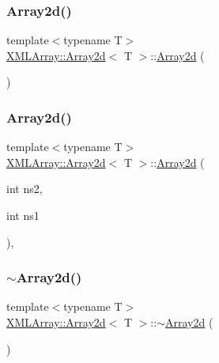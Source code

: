 \subsubsection{\texorpdfstring{Array2d()}{Array2d()}\hspace{0.1cm}{\footnotesize\ttfamily [1/9]}}
{\footnotesize\ttfamily template$<$typename T$>$ \\
\mbox{\hyperlink{classXMLArray_1_1Array2d}{X\+M\+L\+Array\+::\+Array2d}}$<$ T $>$\+::\mbox{\hyperlink{classXMLArray_1_1Array2d}{Array2d}} (\begin{DoxyParamCaption}{ }\end{DoxyParamCaption})\hspace{0.3cm}{\ttfamily [inline]}}

\mbox{\label{classXMLArray_1_1Array2d_acb1e955b2aa805f3192c50cd723df524}} 
\subsubsection{\texorpdfstring{Array2d()}{Array2d()}\hspace{0.1cm}{\footnotesize\ttfamily [2/9]}}
{\footnotesize\ttfamily template$<$typename T$>$ \\
\mbox{\hyperlink{classXMLArray_1_1Array2d}{X\+M\+L\+Array\+::\+Array2d}}$<$ T $>$\+::\mbox{\hyperlink{classXMLArray_1_1Array2d}{Array2d}} (\begin{DoxyParamCaption}\item[{int}]{ns2,  }\item[{int}]{ns1 }\end{DoxyParamCaption})\hspace{0.3cm}{\ttfamily [inline]}, {\ttfamily [explicit]}}

\mbox{\label{classXMLArray_1_1Array2d_a57639b142c7754fa2c11bb3ac5ee76d7}} 
\subsubsection{\texorpdfstring{$\sim$Array2d()}{~Array2d()}\hspace{0.1cm}{\footnotesize\ttfamily [1/3]}}
{\footnotesize\ttfamily template$<$typename T$>$ \\
\mbox{\hyperlink{classXMLArray_1_1Array2d}{X\+M\+L\+Array\+::\+Array2d}}$<$ T $>$\+::$\sim$\mbox{\hyperlink{classXMLArray_1_1Array2d}{Array2d}} (\begin{DoxyParamCaption}{ }\end{DoxyParamCaption})\hspace{0.3cm}{\ttfamily [inline]}}

